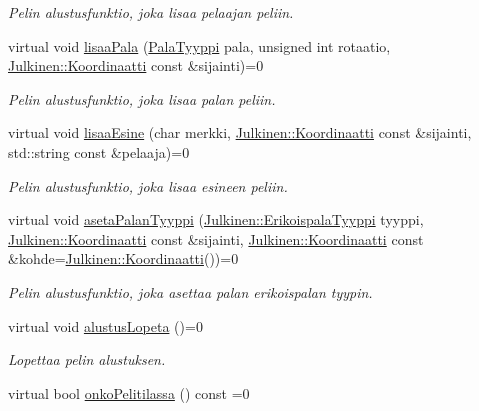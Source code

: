\begin{DoxyCompactItemize}
\begin{DoxyCompactList}\small\item\em Pelin alustusfunktio, joka lisaa pelaajan peliin. \end{DoxyCompactList}\item 
virtual void \hyperlink{class_julkinen_1_1_pelirajapinta_a149820998333ec4d7fa9fd3ff5ea98fd}{lisaa\+Pala} (\hyperlink{namespace_julkinen_a272c70e0503191a485c8a9cd4281e6f5}{Pala\+Tyyppi} pala, unsigned int rotaatio, \hyperlink{class_julkinen_1_1_koordinaatti}{Julkinen\+::\+Koordinaatti} const \&sijainti)=0
\begin{DoxyCompactList}\small\item\em Pelin alustusfunktio, joka lisaa palan peliin. \end{DoxyCompactList}\item 
virtual void \hyperlink{class_julkinen_1_1_pelirajapinta_a998c0b644b8b1b73ac74390afea03da9}{lisaa\+Esine} (char merkki, \hyperlink{class_julkinen_1_1_koordinaatti}{Julkinen\+::\+Koordinaatti} const \&sijainti, std\+::string const \&pelaaja)=0
\begin{DoxyCompactList}\small\item\em Pelin alustusfunktio, joka lisaa esineen peliin. \end{DoxyCompactList}\item 
virtual void \hyperlink{class_julkinen_1_1_pelirajapinta_a4de5389102fb5a479173cc3728b989dd}{aseta\+Palan\+Tyyppi} (\hyperlink{namespace_julkinen_afc26052e09d0b2214f749492cc5fff19}{Julkinen\+::\+Erikoispala\+Tyyppi} tyyppi, \hyperlink{class_julkinen_1_1_koordinaatti}{Julkinen\+::\+Koordinaatti} const \&sijainti, \hyperlink{class_julkinen_1_1_koordinaatti}{Julkinen\+::\+Koordinaatti} const \&kohde=\hyperlink{class_julkinen_1_1_koordinaatti}{Julkinen\+::\+Koordinaatti}())=0
\begin{DoxyCompactList}\small\item\em Pelin alustusfunktio, joka asettaa palan erikoispalan tyypin. \end{DoxyCompactList}\item 
virtual void \hyperlink{class_julkinen_1_1_pelirajapinta_afdcc11ea245937075026e82be6e9a874}{alustus\+Lopeta} ()=0
\begin{DoxyCompactList}\small\item\em Lopettaa pelin alustuksen. \end{DoxyCompactList}\item 
virtual bool \hyperlink{class_julkinen_1_1_pelirajapinta_a3f8d4b6037d2370242f3018c3919c4e2}{onko\+Pelitilassa} () const  =0

\end{DoxyCompactItemize}
